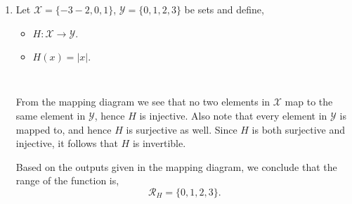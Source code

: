 \documentclass[12pt]{article} %
\begin{document}
\begin{qstn}[2][(8 points)]
\begin{enumerate}[label=(\alph*)]
  \item Let $\mathcal{X} = \{-3-2,0,1\} $, $\mathcal{Y} = \{0,1,2,3\}$ be sets and define,
    \begin{itemize}
      \item $H \colon \mathcal{X} \to \mathcal{Y}$.
      \item $H(x) = \left|x\right|$.
    \end{itemize}
    \begin{solution} \texttt{  }
    \begin{center}
  \end{center}
  From the mapping diagram we see that no two elements in $\mathcal{X}$ map to the same element in $\mathcal{Y}$,
  hence $H$ is injective. Also note that every element in $\mathcal{Y}$ is mapped to, and hence $H$ is surjective
  as well. Since $H$ is both surjective and injective, it follows that $H$ is invertible.

    Based on the outputs given in the mapping diagram, we conclude that the range of the function is,
  \[
          \mathcal{R}_H = \{0,1,2,3\} 
  .\] 
      
    \end{solution}
  \end{enumerate}
\end{qstn}
\end{document}
